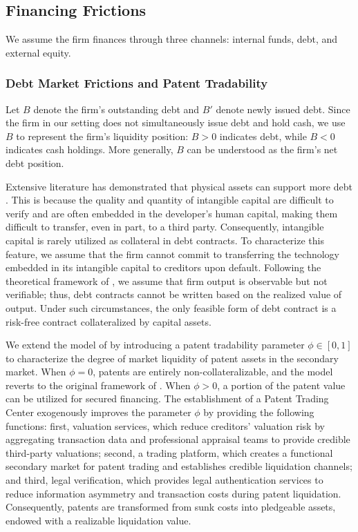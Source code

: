 \documentclass[12pt,a4paper]{article}
\begin{document}
\subsection{Financing Frictions}
We assume the firm finances through three channels: internal funds, debt, and external equity.

\subsubsection{Debt Market Frictions and Patent Tradability}
Let $B$ denote the firm's outstanding debt and $B'$ denote newly issued debt. Since the firm in our setting does not simultaneously issue debt and hold cash, we use $B$ to represent the firm's liquidity position: $B > 0$ indicates debt, while $B < 0$ indicates cash holdings. More generally, $B$ can be understood as the firm's net debt position.

Extensive literature has demonstrated that physical assets can support more debt \citep{hart1994theory,shleifer1992liquidation,rampini2010collateral,sibilkov2009asset}. This is because the quality and quantity of intangible capital are difficult to verify and are often embedded in the developer’s human capital, making them difficult to transfer, even in part, to a third party. Consequently, intangible capital is rarely utilized as collateral in debt contracts. To characterize this feature, we assume that the firm cannot commit to transferring the technology embedded in its intangible capital to creditors upon default. Following the theoretical framework of \cite{hart1994theory}, we assume that firm output is observable but not verifiable; thus, debt contracts cannot be written based on the realized value of output. Under such circumstances, the only feasible form of debt contract is a risk-free contract collateralized by capital assets.

We extend the model of \cite{falato2022rising} by introducing a patent tradability parameter $\phi \in [0,1]$ to characterize the degree of market liquidity of patent assets in the secondary market. When $\phi = 0$, patents are entirely non-collateralizable, and the model reverts to the original framework of \cite{falato2022rising}. When $\phi > 0$, a portion of the patent value can be utilized for secured financing. The establishment of a Patent Trading Center exogenously improves the parameter $\phi$ by providing the following functions: first, valuation services, which reduce creditors' valuation risk by aggregating transaction data and professional appraisal teams to provide credible third-party valuations; second, a trading platform, which creates a functional secondary market for patent trading and establishes credible liquidation channels; and third, legal verification, which provides legal authentication services to reduce information asymmetry and transaction costs during patent liquidation. Consequently, patents are transformed from sunk costs into pledgeable assets, endowed with a realizable liquidation value.
\end{document}
